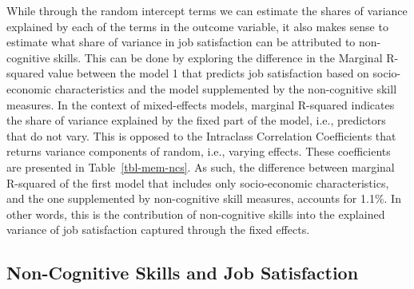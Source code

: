 \documentclass[
]{interact}
\begin{document}
While through the random intercept terms we can estimate the shares of
variance explained by each of the terms in the outcome variable, it also
makes sense to estimate what share of variance in job satisfaction can
be attributed to non-cognitive skills. This can be done by exploring the
difference in the Marginal R-squared value between the model 1 that
predicts job satisfaction based on socio-economic characteristics and
the model supplemented by the non-cognitive skill measures. In the
context of mixed-effects models, marginal R-squared indicates the share
of variance explained by the fixed part of the model, i.e., predictors
that do not vary. This is opposed to the Intraclass Correlation
Coefficients that returns variance components of random, i.e., varying
effects. These coefficients are presented in Table~\ref{tbl-mem-ncs}. As
such, the difference between marginal R-squared of the first model that
includes only socio-economic characteristics, and the one supplemented
by non-cognitive skill measures, accounts for 1.1\%. In other words,
this is the contribution of non-cognitive skills into the explained
variance of job satisfaction captured through the fixed effects.

\begin{table}

\caption{\label{tbl-icc-baseline}Intraclass Correlation Coefficients of
the Baseline Mixed-Effects Model, Job Satisfaction by the Random
Intercept Terms of Individual ID, Region, and Hourly Wage}


\end{table}%

\subsection{Non-Cognitive Skills and Job
Satisfaction}\label{non-cognitive-skills-and-job-satisfaction}
\end{document}
